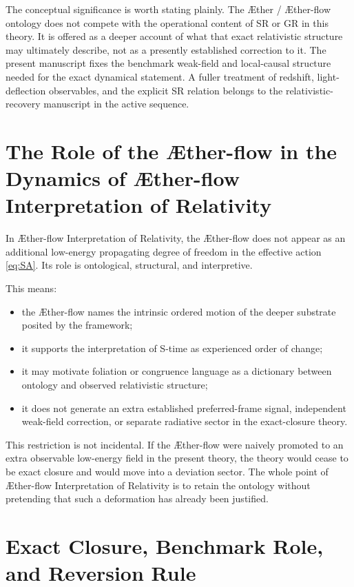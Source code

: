 \documentclass[11pt]{article}
\newcommand{\Aether}{\AE{}ther}
\newcommand{\Aflow}{\AE{}ther-flow}
\newcommand{\TheoryName}{\Aflow{} Interpretation of Relativity}
\begin{document}
The conceptual significance is worth stating plainly. The \Aether{} / \Aflow{} ontology does not compete with the operational content of SR or GR in this theory. It is offered as a deeper account of what that exact relativistic structure may ultimately describe, not as a presently established correction to it. The present manuscript fixes the benchmark weak-field and local-causal structure needed for the exact dynamical statement. A fuller treatment of redshift, light-deflection observables, and the explicit SR relation belongs to the relativistic-recovery manuscript in the active sequence.

\section{The Role of the \Aflow{} in the Dynamics of \TheoryName{}}

In \TheoryName{}, the \Aflow{} does not appear as an additional low-energy propagating degree of freedom in the effective action \eqref{eq:SA}. Its role is ontological, structural, and interpretive.

This means:
\begin{itemize}
    \item the \Aflow{} names the intrinsic ordered motion of the deeper substrate posited by the framework;
    \item it supports the interpretation of S-time as experienced order of change;
    \item it may motivate foliation or congruence language as a dictionary between ontology and observed relativistic structure;
    \item it does not generate an extra established preferred-frame signal, independent weak-field correction, or separate radiative sector in the exact-closure theory.
\end{itemize}

This restriction is not incidental. If the \Aflow{} were naively promoted to an extra observable low-energy field in the present theory, the theory would cease to be exact closure and would move into a deviation sector. The whole point of \TheoryName{} is to retain the ontology without pretending that such a deformation has already been justified.

\section{Exact Closure, Benchmark Role, and Reversion Rule}
\end{document}
